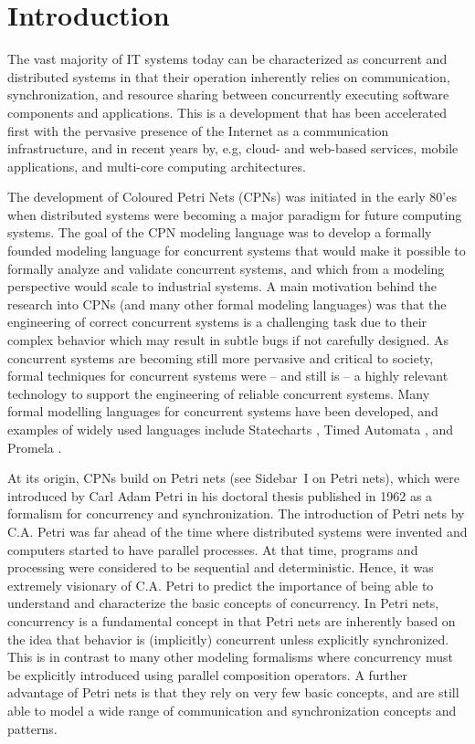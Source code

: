 \section{Introduction}

The vast majority of IT systems today can be characterized as
concurrent and distributed systems in that their operation inherently
relies on communication, synchronization, and resource sharing between
concurrently executing software components and applications. This is a
development that has been accelerated first with the pervasive
presence of the Internet as a communication infrastructure, and in
recent years by, e.g, cloud- and web-based services, mobile
applications, and multi-core computing architectures.


The development of Coloured Petri Nets (CPNs) was initiated in the
early 80'es when distributed systems were becoming a major paradigm
for future computing systems. The goal of the CPN modeling language
was to develop a formally founded modeling language for concurrent
systems that would make it possible to formally analyze and validate
concurrent systems, and which from a modeling perspective would scale
to industrial systems. A main motivation behind the research into CPNs
(and many other formal modeling languages) was that the engineering of
correct concurrent systems is a challenging task due to their complex
behavior which may result in subtle bugs if not carefully designed. As
concurrent systems are becoming still more pervasive and critical to
society, formal techniques for concurrent systems were -- and still is
-- a highly relevant technology to support the engineering of reliable
concurrent systems. Many formal modelling languages for concurrent
systems have been developed, and examples of widely used languages
include Statecharts \cite{statecharts}, Timed Automata
\cite{timedautomata}, and Promela \cite{promela}.


At its origin, CPNs build on Petri nets (see Sidebar~I on Petri nets),
which were introduced by Carl Adam Petri in his doctoral thesis
published in 1962 \cite{capetri:thesis} as a formalism for concurrency
and synchronization. The introduction of Petri nets by C.A. Petri was
far ahead of the time where distributed systems were invented and
computers started to have parallel processes. At that time, programs
and processing were considered to be sequential and
deterministic. Hence, it was extremely visionary of C.A. Petri to
predict the importance of being able to understand and characterize
the basic concepts of concurrency. In Petri nets, concurrency is a
fundamental concept in that Petri nets are inherently based on the idea
that behavior is (implicitly) concurrent unless explicitly
synchronized. This is in contrast to many other modeling formalisms
where concurrency must be explicitly introduced using parallel
composition operators. A further advantage of Petri nets is that they
rely on very few basic concepts, and are still able to model a wide
range of communication and synchronization concepts and patterns.\\

